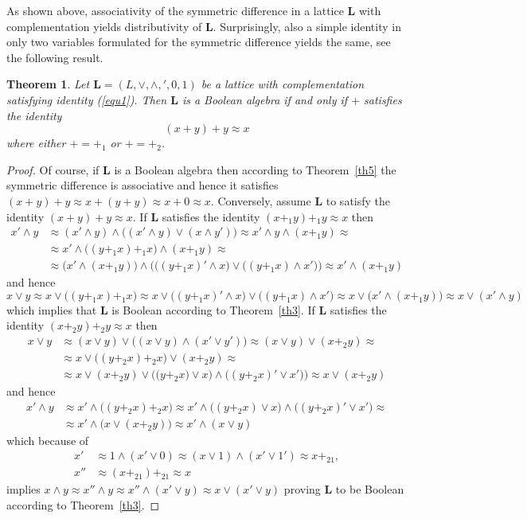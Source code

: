 \documentclass[12pt]{article}
\newtheorem{theorem}{Theorem}[section]
\begin{document}
As shown above, associativity of the symmetric difference in a lattice $\mathbf L$ with complementation yields distributivity of $\mathbf L$. Surprisingly, also a simple identity in only two variables formulated for the symmetric difference yields the same, see the following result.

\begin{theorem}
Let $\mathbf L=(L,\vee,\wedge,{}',0,1)$ be a lattice with complementation satisfying identity {\rm(\ref{equ1})}. Then $\mathbf L$ is a Boolean algebra if and only if $+$ satisfies the identity
\[
(x+y)+y\approx x
\]
where either $+=+_1$ or $+=+_2$.
\end{theorem}

\begin{proof}
Of course, if $\mathbf L$ is a Boolean algebra then according to Theorem~\ref{th5} the symmetric difference is associative and hence it satisfies $(x+y)+y\approx x+(y+y)\approx x+0\approx x$. Conversely, assume $\mathbf L$ to satisfy the identity $(x+y)+y\approx x$. If $\mathbf L$ satisfies the identity $(x+_1y)+_1y\approx x$ then
\begin{align*}
	x'\wedge y & \approx(x'\wedge y)\wedge\big((x'\wedge y)\vee(x\wedge y')\big)\approx x'\wedge y\wedge(x+_1y)\approx \\
	& \approx x'\wedge\big((y+_1x)+_1x\big)\wedge(x+_1y)\approx \\
	& \approx\big( x'\wedge(x+_1y)\big)\wedge\Big(\big((y+_1x)'\wedge x\big)\vee\big((y+_1x)\wedge x'\big)\Big)\approx x'\wedge(x+_1y)	
\end{align*}
and hence
\[
x\vee y\approx x\vee\big((y+_1x)+_1x\big)\approx x\vee\big((y+_1x)'\wedge x\big)\vee\big((y+_1x)\wedge x'\big)\approx x\vee\big(x'\wedge(x+_1y)\big)\approx x\vee(x'\wedge y)
\]
which implies that $\mathbf L$ is Boolean according to Theorem~\ref{th3}. If $\mathbf L$ satisfies the identity $(x+_2y)+_2y\approx x$ then
\begin{align*}
	x\vee y & \approx(x\vee y)\vee\big((x\vee y)\wedge(x'\vee y')\big)\approx(x\vee y)\vee(x+_2y)\approx \\
	& \approx x\vee\big((y+_2x)+_2x\big)\vee(x+_2y)\approx \\
	& \approx x\vee(x+_2y)\vee\Big(\big(y+_2x)\vee x\big)\wedge\big((y+_2x)'\vee x'\big)\Big)\approx x\vee(x+_2y)	
\end{align*}
and hence
\begin{align*}
	x'\wedge y & \approx x'\wedge\big((y+_2x)+_2x\big)\approx x'\wedge\big((y+_2x)\vee x\big)\wedge\big((y+_2x)'\vee x'\big)\approx \\
	& \approx x'\wedge\big(x\vee(x+_2y)\big)\approx x'\wedge(x\vee y)
\end{align*}
which because of
\begin{align*}
	x' & \approx1\wedge(x'\vee0)\approx(x\vee1)\wedge(x'\vee1')\approx x+_21, \\
	x'' & \approx(x+_21)+_21\approx x
\end{align*}
implies $x\wedge y\approx x''\wedge y\approx x''\wedge(x'\vee y)\approx x\vee(x'\vee y)$ proving $\mathbf L$ to be Boolean according to Theorem~\ref{th3}.
\end{proof}
\end{document}
